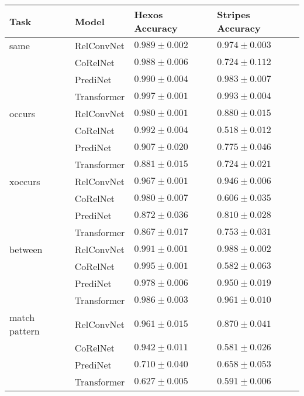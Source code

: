 \begin{tabular}{llll}
\toprule
Task & Model &     Hexos Accuracy &   Stripes Accuracy \\
\midrule
same & RelConvNet &  $0.989 \pm 0.002$ &  $0.974 \pm 0.003$ \\
              & CoRelNet &  $0.988 \pm 0.006$ &  $0.724 \pm 0.112$ \\
              & PrediNet &  $0.990 \pm 0.004$ &  $0.983 \pm 0.007$ \\
              & Transformer &  $0.997 \pm 0.001$ &  $0.993 \pm 0.004$ \\
              \hline
occurs & RelConvNet &  $0.980 \pm 0.001$ &  $0.880 \pm 0.015$ \\
              & CoRelNet &  $0.992 \pm 0.004$ &  $0.518 \pm 0.012$ \\
              & PrediNet &  $0.907 \pm 0.020$ &  $0.775 \pm 0.046$ \\
              & Transformer &  $0.881 \pm 0.015$ &  $0.724 \pm 0.021$ \\
              \hline
xoccurs & RelConvNet &  $0.967 \pm 0.001$ &  $0.946 \pm 0.006$ \\
              & CoRelNet &  $0.980 \pm 0.007$ &  $0.606 \pm 0.035$ \\
              & PrediNet &  $0.872 \pm 0.036$ &  $0.810 \pm 0.028$ \\
              & Transformer &  $0.867 \pm 0.017$ &  $0.753 \pm 0.031$ \\
              \hline
between & RelConvNet &  $0.991 \pm 0.001$ &  $0.988 \pm 0.002$ \\
              & CoRelNet &  $0.995 \pm 0.001$ &  $0.582 \pm 0.063$ \\
              & PrediNet &  $0.978 \pm 0.006$ &  $0.950 \pm 0.019$ \\
              & Transformer &  $0.986 \pm 0.003$ &  $0.961 \pm 0.010$ \\
              \hline
match pattern & RelConvNet &  $0.961 \pm 0.015$ &  $0.870 \pm 0.041$ \\
              & CoRelNet &  $0.942 \pm 0.011$ &  $0.581 \pm 0.026$ \\
              & PrediNet &  $0.710 \pm 0.040$ &  $0.658 \pm 0.053$ \\
              & Transformer &  $0.627 \pm 0.005$ &  $0.591 \pm 0.006$ \\
\bottomrule
\end{tabular}
